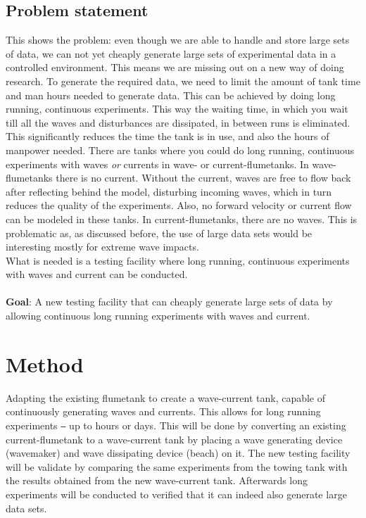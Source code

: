 \subsection*{Problem statement}
\label{sec:problem}
This shows the problem: even though we are able to handle and store large sets of data, we can not yet cheaply generate large sets of experimental data in a controlled environment. This means we are missing out on a new way of doing research.
To generate the required data, we need to limit the amount of tank time and man hours needed to generate data. This can be achieved by doing long running, continuous experiments. This way the waiting time, in which you wait till all the waves and disturbances are dissipated, in between runs is eliminated. This significantly reduces the time the tank is in use, and also the hours of manpower needed. 
There are tanks where you could do long running, continuous experiments with waves \textit{or} currents in wave- or current-flumetanks.  In wave-flumetanks there is no current. Without the current, waves are free to flow back after reflecting behind the model, disturbing incoming waves, which in turn reduces the quality of the experiments. Also, no forward velocity or current flow can be modeled in these tanks. In current-flumetanks, there are no waves. This is problematic as, as discussed before, the use of large data sets would be interesting mostly for extreme wave impacts. \\
What is needed is a testing facility where long running, continuous experiments with waves and current can be conducted.\\ \\
\textbf{Goal}: 
A new testing facility that can cheaply generate large sets of data by allowing continuous long running experiments with waves and current.


\section{Method}
\label{sec:method}
Adapting the existing flumetank to create a wave-current tank, capable of continuously generating waves and currents. This allows for long running experiments \texttt{---} up to hours or days. This will be done by converting an existing current-flumetank to a wave-current tank by placing a wave generating device (wavemaker) and wave dissipating device (beach) on it. The new testing facility will be validate by comparing the same experiments from the towing tank with the results obtained from the new wave-current tank. Afterwards long experiments will be conducted to verified that it can indeed also generate large data sets. 

